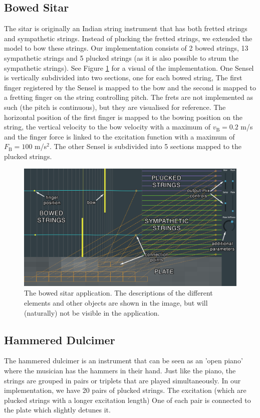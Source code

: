 \documentclass{article}
\begin{document}
\subsection{Bowed Sitar}
The sitar is originally an Indian string instrument that has both fretted strings and sympathetic strings. Instead of plucking the fretted strings, we extended the model to bow these strings. Our implementation consists of 2 bowed strings, 13 sympathetic strings and 5 plucked strings (as it is also possible to strum the sympathetic strings). See Figure \ref{fig:bowedSitar} for a visual of the implementation. One Sensel is vertically subdivided into two sections, one for each bowed string, The first finger registered by the Sensel is mapped to the bow and the second is mapped to a fretting finger on the string controlling pitch. The frets are not implemented as such (the pitch is continuous), but they are visualised for reference. The horizontal position of the first finger is mapped to the bowing position on the string, the vertical velocity  to the bow velocity with a maximum of $v_\text{B} = 0.2$ m/s and the finger force is linked to the excitation function with a maximum of $F_\text{B} = 100$ m/s$^2$. The other Sensel is subdivided into 5 sections mapped to the plucked strings. 

\begin{figure}[h]
\centering
\includegraphics[width=1.0\columnwidth]{LATEX/BowedSitar.png}
\caption{The bowed sitar application. The descriptions of the different elements and other objects are shown in the image, but will (naturally) not be visible in the application. \label{fig:bowedSitar}}
\end{figure}

\subsection{Hammered Dulcimer}
The hammered dulcimer is an instrument that can be seen as an 'open piano' where the musician has the hammers in their hand. Just like the piano, the strings are grouped in pairs or triplets
that are played simultaneously. 
In our implementation, we have 20 pairs of plucked strings. The excitation (which are plucked strings with a longer excitation length) %
One of each pair is connected to the plate which slightly detunes it.
\end{document}
